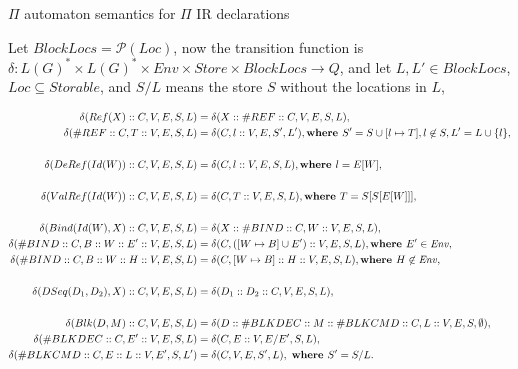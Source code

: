 \documentclass{beamer}
\begin{document}
\begin{frame}{{\color{red}$\Pi$ automaton} semantics for {\color{red}$\Pi$ IR} declarations}

Let $\mathit{BlockLocs} = \mathcal{P}(\mathit{Loc})$, now the transition function is $\delta : L(G)^* \times L(G)^* \times Env \times Store \times \mathit{BlockLocs} \to Q$, and let $L, L' \in \mathit{BlockLocs}$, $\mathit{Loc} \subseteq \mathit{Storable}$, and $S / L$ means the store $S$ without the locations in $L$,

\begin{tiny}
\begin{align}
\delta(Ref(X) :: C, V, E, S, L) & = \delta(X :: \#REF :: C, V, E, S, L), \\
\delta(\#REF :: C, T :: V, E, S, L) & = \delta(C, l :: V, E, S', L'), \text{\bf where } S' = S \cup [l \mapsto T], l \not\in S, L' = L \cup \{l\}, \\ \nonumber \\
\delta(DeRef(Id(W)) :: C, V, E, S, L) & = \delta(C, l :: V, E, S, L), \text{\bf where } l = E[W],  \\ \nonumber \\
\delta(ValRef(Id(W)) :: C, V, E, S, L) & = \delta(C, T :: V, E, S, L), \text{\bf where } T = S[S[E[W]]],  \\ \nonumber \\
\delta(Bind(Id(W), X) :: C, V, E, S, L) &= \delta(X :: \#BIND :: C, W :: V, E, S, L), \\
\delta(\#BIND :: C, B :: W :: E' :: V, E, S, L) &= \delta(C, ([W \mapsto B] \cup E') :: V, E, S, L), \text{\bf where } E' \in \mathit{Env},\\
\delta(\#BIND :: C, B :: W :: H :: V, E, S, L) &= \delta(C, [W \mapsto B] :: H :: V, E, S, L), \text{\bf where } H \not\in \mathit{Env},  \\ \nonumber \\
\delta(DSeq(D_1, D_2), X) :: C, V, E, S, L) &= \delta(D_1 :: D_2 :: C, V, E, S, L), \\ \nonumber \\
\delta(Blk(D, M) :: C, V, E, S, L) &= \delta(D :: \#BLKDEC :: M :: \#BLKCMD :: C, L :: V, E, S, \emptyset), \\
\delta(\#BLKDEC :: C, E' :: V, E, S, L) &= \delta(C, E :: V, E / E', S, L), \\
\delta(\#BLKCMD :: C, E :: L :: V, E', S, L') &= \delta(C, V, E, S', L), \text{ \bf where } S' = S / L.
\end{align}
\end{tiny}

\end{frame}
\end{document}
